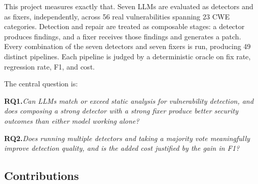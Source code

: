 \documentclass[12pt]{article}
\begin{document}
This project measures exactly that. Seven LLMs are evaluated as detectors and
as fixers, independently, across 56 real vulnerabilities spanning 23 CWE
categories. Detection and repair are treated as composable stages: a detector
produces findings, and a fixer receives those findings and generates a patch.
Every combination of the seven detectors and seven fixers is run, producing 49
distinct pipelines. Each pipeline is judged by a deterministic oracle on fix
rate, regression rate, F1, and cost.

The central question is:

\medskip
\noindent\textbf{RQ1.}\quad\textit{Can LLMs match or exceed static analysis
for vulnerability detection, and does composing a strong detector with a strong
fixer produce better security outcomes than either model working alone?}

\smallskip
\noindent\textbf{RQ2.}\quad\textit{Does running multiple detectors and taking
a majority vote meaningfully improve detection quality, and is the added cost
justified by the gain in F1?}
\medskip

\subsection{Contributions}
\end{document}

